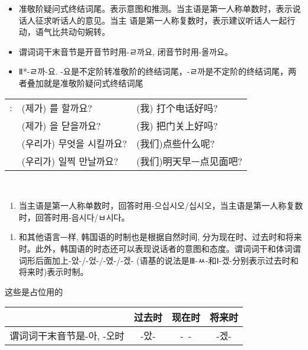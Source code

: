 \begin{grammar}
	\begin{grammarsect}[ -(으)ㄹ까요]
		\begin{itemize}
			\item 准敬阶疑问式终结词尾。表示意图和推测。当主语是第一人称单数时，表示说话人征求听话人的意见。当主 语是第一人称复数时，表示建议听话人一起行动，语气比共动句婉转。
			\item 谓词词干末音节是开音节时用-ㄹ까요, 闭音节时用-올까요。
			\item {\color{gray} Ⅱ*-ㄹ까-요. -요是不定阶转准敬阶的终结词尾，-ㄹ까是不定阶的终结词尾，两者叠加就是准敬阶疑问式终结词尾}
		\end{itemize}
		\begin{tabular}{lll}
			\ruby{例}{예}: & (제가) \ruby{電話}{전화}를 할까요?     & (我) 打个电话好吗?   \\
			             & (제가) \ruby{門}{문}을 닫을까요?      & (我) 把门关上好吗?   \\
			             & (우리가) 무엇을 시킬까요?              & (我们)点些什么呢?    \\
			             & (우리가) \ruby{來日}{내일} 일찍 만날까요? & (我们)明天早ᅳ点见面吧? \\
		\end{tabular}\\
		\begin{enumerate}
			\item 当主语是第一人称单数时，回答时用-으십시오/십시오，当主语是第一人称复数时，回答时用-읍시다/ㅂ시다。
		\end{enumerate}
	\end{grammarsect}
	\begin{grammarsect}[时制]
		\begin{enumerate}
			\item 和其他语言ᅳ样, 韩国语的时制也是根据自然时间, 分为现在时、过去时和将来时。此外，韩国语的时态还可以表现说话者的意图和态度。谓词词干和体词谓词形后面加上-았-/-었-/-였-/-겠-{\color{gray} (语基的说法是Ⅲ-ㅆ-和Ⅰ-겠-分别表示过去时和将来时)}表示时制。
		\end{enumerate}{\color{white} 这些是占位用的}
		\begin{tabular}{|l|c|c|c|}
			\hline
			\diagbox{用法{\color{white} 啊啊啊啊啊啊}}{时制} & 过去时 & 现在时                   & 将来时                  \\\hline
			谓词词干末音节是-아, -오时                        & -았- & \multirow{3}{*}{-\ -} & \multirow{3}{*}{-겠-} \\\cline{1-2}

\end{tabular}
\end{grammarsect}
\end{grammar}
